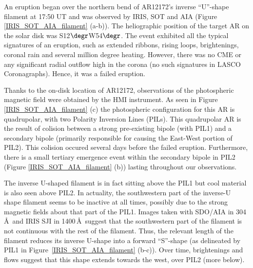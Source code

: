 \documentclass[preprint]{aastex}
\begin{document}
\begin{figure*}
\caption{(a)  The FOV of each instrument (IRIS Slit-Jaw Imager and SOT) superimposed on a 131\,\AA\ snapshot image from SDO/AIA. (b) Image from SDO/AIA at 304\,\AA\ showing the filament and other annotated features in the core of target AR12172. Contours of photospheric $|\mathrm{B}_\mathrm{LOS}|$=200\,G (positive/light blue; negative/yellow) are overplotted on the 304\,\AA\ image. (c) $|\mathrm{B}_\mathrm{LOS}|$ map from SDO/HMI of the same area of panel (b) showing the general quadrupolar configuration of AR12172. The PILs are traced with colored dots in both panels.}
 \label{IRIS_SOT_AIA_filament}
\end{figure*}


An eruption began over the northern bend of AR12172's inverse ``U''-shape filament at 17:50 UT and was observed by IRIS, SOT and AIA (Figure \ref{IRIS_SOT_AIA_filament} (a-b)). The heliographic position of the target AR on the solar disk was S12$\degr$W54$\degr$. The event exhibited all the typical signatures of an eruption, such as extended ribbons, rising loops, brightenings, coronal rain and several million degree heating. However, there was no CME or any significant radial outflow high in the corona (no such signatures in LASCO Coronagraphs). Hence, it was a failed eruption.

Thanks to the on-disk location of AR12172, observations of the photospheric magnetic field were obtained by the HMI instrument. As seen in Figure \ref{IRIS_SOT_AIA_filament} (c) the photospheric configuration for this AR is quadrupolar, with two Polarity Inversion Lines (PILs). This quadrupolar AR is the result of colision between a strong pre-existing bipole (with PIL1) and a secondary bipole (primarily responsible for causing the East-West portion of PIL2). This colision occured several days before the failed eruption. Furthermore, there is a small tertiary emergence event within the secondary bipole in PIL2 (Figure \ref{IRIS_SOT_AIA_filament} (b)) lasting throughout our observations. 

The inverse U-shaped filament is in fact sitting above the PIL1 but cool material is also seen above PIL2. In actuality, the southwestern part of the inverse-U shape filament seems to be inactive at all times, possibly due to the strong magnetic fields about that part of the PIL1. Images taken with SDO/AIA in 304\,\AA\ and IRIS SJI in 1400\,\AA\ suggest that the southwestern part of the filament is not continuous with the rest of the filament. Thus, the relevant length of the filament reduces its inverse U-shape into a forward ``S''-shape (as delineated by PIL1 in Figure~\ref{IRIS_SOT_AIA_filament} (b-c)). Over time, brightenings and flows suggest that this shape extends towards the west, over PIL2 (more below).
\end{document}
